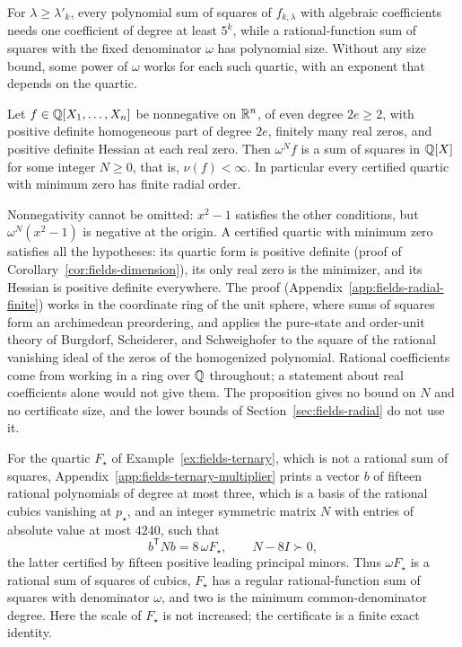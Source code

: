 For $\lambda\ge\lambda'_k$, every polynomial sum of squares of
$f_{k,\lambda}$ with algebraic coefficients needs one coefficient of degree at least
$5^k$, while a rational-function sum of squares with the fixed denominator
$\omega$ has polynomial size. Without any size bound, some power of $\omega$
works for each such quartic, with an exponent that depends on the quartic.

\begin{proposition}
\label{prop:fields-radial-finite}
Let $f\in\mathbb Q[X_1,\ldots,X_n]$ be nonnegative on $\mathbb R^n$, of even degree
$2e\ge2$, with positive definite homogeneous part of degree $2e$, finitely
many real zeros, and positive definite Hessian at each real zero. Then
$\omega^Nf$ is a sum of squares in $\mathbb Q[X]$ for some integer $N\ge0$, that
is, $\nu(f)<\infty$. In particular every certified quartic with minimum zero
has finite radial order.
\end{proposition}

Nonnegativity cannot be omitted: $x^2-1$ satisfies the other conditions, but
$\omega^N(x^2-1)$ is negative at the origin. A certified quartic with minimum
zero satisfies all the hypotheses: its quartic form is positive definite
(proof of Corollary~\ref{cor:fields-dimension}), its only real zero is the
minimizer, and its Hessian is positive definite everywhere. The proof
(Appendix~\ref{app:fields-radial-finite}) works in the coordinate ring of the
unit sphere, where sums of squares form an archimedean preordering, and
applies the pure-state and order-unit theory of Burgdorf, Scheiderer, and
Schweighofer \cite{BurgdorfScheidererSchweighofer2012} to the square of the
rational vanishing ideal of the zeros of the homogenized polynomial. Rational
coefficients come from working in a ring over $\mathbb Q$ throughout; a statement
about real coefficients alone would not give them. The proposition gives no
bound on $N$ and no certificate size, and the lower bounds of
Section~\ref{sec:fields-radial} do not use it.

\begin{example}
\label{ex:fields-ternary-multiplier}
For the quartic $F_\star$ of Example~\ref{ex:fields-ternary}, which is not a
rational sum of squares, Appendix~\ref{app:fields-ternary-multiplier} prints
a vector $b$ of fifteen rational polynomials of degree at most three, which is
a basis of the rational cubics vanishing at $p_\star$, and an integer
symmetric matrix $N$ with entries of absolute value at most $4240$, such that
\[
 b^{\mathsf T}Nb=8\,\omega F_\star,\qquad N-8I\succ0,
\]
the latter certified by fifteen positive leading principal minors. Thus
$\omega F_\star$ is a rational sum of squares of cubics, $F_\star$ has a
regular rational-function sum of squares with denominator $\omega$, and two is
the minimum common-denominator degree. Here the scale of $F_\star$ is not
increased; the certificate is a finite exact identity.
\end{example}

